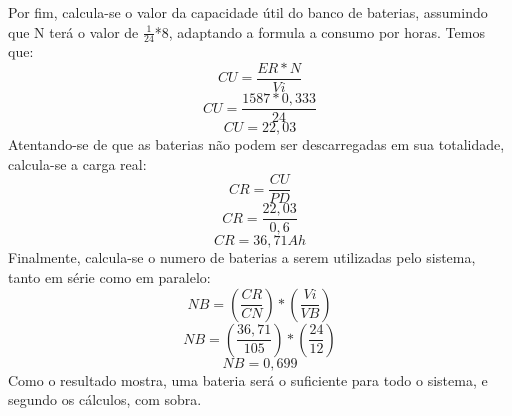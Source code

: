 Por fim, calcula-se o valor da capacidade útil do banco de baterias, assumindo que N terá o valor de $\frac{1}{24}$*8, adaptando a formula a consumo por horas. Temos que:
\[CU=\frac{ER*N}{Vi}\]
\[CU=\frac{1587*0,333}{24}\]
\[CU=22,03\]
Atentando-se de que as baterias não podem ser descarregadas em sua totalidade, calcula-se a carga real:
\[CR=\frac{CU}{PD}\]
\[CR=\frac{22,03}{0,6}\]
\[CR=36,71Ah\]
Finalmente, calcula-se o numero de baterias a serem utilizadas pelo sistema, tanto em série como em paralelo:
\[NB=\left ( \frac{CR}{CN} \right )*\left ( \frac{Vi}{VB} \right )\]
\[NB=\left ( \frac{36,71}{105} \right )*\left ( \frac{24}{12} \right )\]
\[NB=0,699\]
Como o resultado mostra, uma bateria será o suficiente para todo o sistema, e segundo os cálculos, com sobra.

